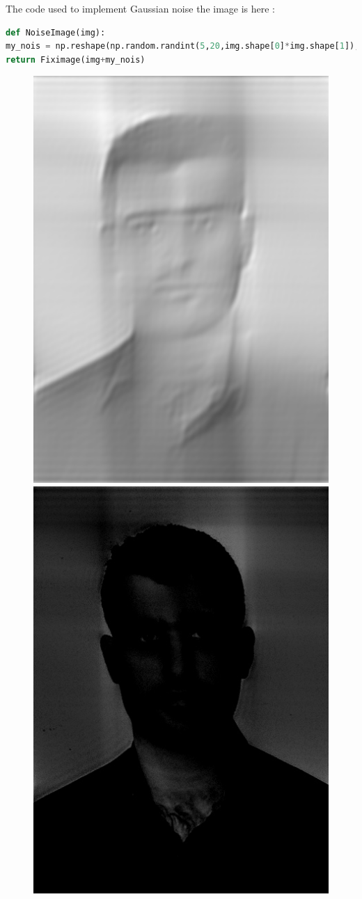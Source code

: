 \documentclass{article}
\begin{document}
The code used to implement Gaussian noise the image is here : 
\begin{lstlisting}[language=Python]
def NoiseImage(img):
my_nois = np.reshape(np.random.randint(5,20,img.shape[0]*img.shape[1]),(img.shape[0],img.shape[1]))
return Fiximage(img+my_nois)
\end{lstlisting}

\begin{figure}[H]
	\includegraphics[scale=0.5]{mypic_ILPF.jpg}
	\includegraphics[scale=0.5]{mypic_IHPF.jpg}

\end{figure}
\end{document}
